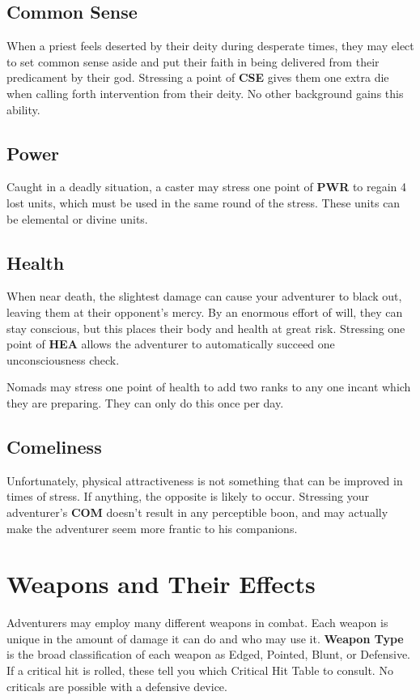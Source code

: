 \begin{multicols*}{2}
\subsection{Common Sense}
When a priest feels deserted by their deity during desperate times, they may elect to set common sense aside and put their faith in being delivered from their predicament by their god. Stressing a point of \textbf{CSE} gives them one extra die when calling forth intervention from their deity. No other background gains this ability.
\subsection{Power}
Caught in a deadly situation, a caster may stress one point of \textbf{PWR} to regain 4 lost units, which must be used in the same round of the stress. These units can be elemental or divine units.
\subsection{Health}
When near death, the slightest damage can cause your adventurer to black out, leaving them at their opponent’s mercy. By an enormous effort of will, they can stay conscious, but this places their body and health at great risk. Stressing one point of \textbf{HEA} allows the adventurer to automatically succeed one unconsciousness check.

Nomads may stress one point of health to add two ranks to any one incant which they are preparing. They can only do this once per day.
\subsection{Comeliness}
Unfortunately, physical attractiveness is not something that can be improved in times of stress. If anything, the opposite is likely to occur. Stressing your adventurer’s \textbf{COM} doesn’t result in any perceptible boon, and may actually make the adventurer seem more frantic to his companions.
\end{multicols*}
\section{Weapons and Their Effects}
Adventurers may employ many different weapons in combat. Each weapon is unique in the amount of damage it can do and who may use it.
\textbf{Weapon Type} is the broad classification of each
weapon as Edged, Pointed, Blunt, or Defensive. If a critical hit is rolled, these tell you which Critical Hit Table to consult. No criticals are possible with a defensive device.

